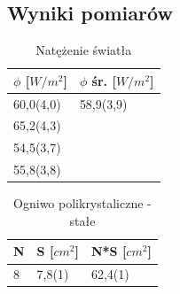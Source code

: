 \documentclass[12pt,a4paper]{article}
\begin{document}
\subsection{Wyniki pomiarów}

\begin{table}[H]
\centering
\caption{Natężenie światła}
\label{my-label}
\begin{tabular}{|p{3cm}|p{3cm}|}
\hline
$\phi$ {[}$W/m^2${]}	& $\phi$ śr. {[}$W/m^2${]}\\
\hline
60,0(4,0)				& 58,9(3,9)	\\
65,2(4,3)				&			\\
54,5(3,7)				&			\\
55,8(3,8)				&			\\
\hline   
\end{tabular}
\end{table}

\begin{table}[H]
\centering
\caption{Ogniwo polikrystaliczne - stałe}
\label{polistale}
\begin{tabular}{|p{2cm}|p{2cm}|p{2cm}|}
\hline
N & S {[}$cm^2${]} & N*S {[}$cm^2${]}   \\
\hline
8 & 7,8(1) & 62,4(1) \\
\hline
\end{tabular}
\end{table}
\end{document}
